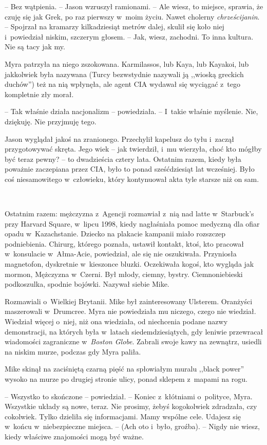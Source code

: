 \documentclass[oneside,polish,11pt,sfheadings]{mwbk}
\begin{document}
-- Bez wątpienia. -- Jason wzruszył ramionami. -- Ale wiesz, to miejsce,
sprawia, że czuję się jak Grek, po raz pierwszy w~moim życiu. Nawet
cholerny \textit{chrześcijanin}. -- Spojrzał na kramarzy kilkadziesiąt
metrów dalej, skulił się koło niej i~powiedział niskim, szczerym głosem.
-- Jak, wiesz, zachodni. To inna kultura. Nie są tacy jak my.

Myra patrzyła na niego zszokowana. Karmilassos, lub Kaya, lub Kayakoi,
lub jakkolwiek była nazywana (Turcy bezwstydnie nazywali ją ,,wioską
greckich duchów'') też na nią wpłynęła, ale agent CIA wydawał się
wyciągać z~tego kompletnie zły morał.

-- Tak właśnie działa nacjonalizm -- powiedziała. -- I~takie właśnie
myślenie. Nie, dziękuję. Nie przyjmuję tego.

Jason wyglądał jakoś na zranionego. Przechylił kapelusz do tyłu i~zaczął
przygotowywać skręta. Jego wiek -- jak twierdził, i~mu wierzyła, choć kto
mógłby być teraz pewny? -- to dwadzieścia cztery lata. Ostatnim razem,
kiedy była poważnie zaczepiana przez CIA, było to ponad sześćdziesiąt
lat wcześniej. Było coś niesamowitego w~człowieku, który kontynuował
akta tyle starsze niż on sam.

~

Ostatnim razem: mężczyzna z~Agencji rozmawiał z~nią nad latte w~Starbuck's przy Harvard Square, w~lipcu 1998, kiedy nagłaśniała pomoc
medyczną dla ofiar opadu w~Kazachstanie. Dziecko na plakacie kampanii
miało rozszczep podniebienia. Chirurg, którego poznała, ustawił kontakt,
ktoś, kto pracował w~konsulacie w~Ałma-Acie, powiedział, ale się nie
oszukiwała. Przyniosła magnetofon, dyskretnie w~kieszonce bluzki.
Oczekiwała kogoś, kto wygląda jak mormon, Mężczyzna w~Czerni. Był młody,
ciemny, bystry. Ciemnoniebieski podkoszulka, spodnie bojówki. Nazywał
siebie Mike.

Rozmawiali o~Wielkiej Brytanii. Mike był zainteresowany Ulsterem.
Oranżyści maszerowali w~Drumcree. Myra nie powiedziała mu niczego, czego
nie wiedział. Wiedział więcej o~niej, niż ona wiedziała, od niechcenia podane
nazwy demonstracji, na których była w~latach siedemdziesiątych, gdy
leniwie przewracał wiadomości zagraniczne w~\textit{Boston Globe}. Zabrali
swoje kawy na zewnątrz, usiedli na niskim murze, podczas gdy Myra
paliła.

Mike skinął na zaciśniętą czarną pięść na spłowiałym muralu ,,black
power'' wysoko na murze po drugiej stronie ulicy, ponad sklepem z~mapami
na rogu. 

-- Wszystko to skończone -- powiedział. -- Koniec z~kłótniami o~polityce, Myra. Wszystkie układy są nowe, teraz. Nie prosimy, żebyś
kogokolwiek zdradzała, czy cokolwiek. Tylko dzieliła się informacjami.
Mamy wspólne cele. Udajesz się w~końcu w~niebezpieczne miejsca. -- (Ach
oto i~było, groźba). -- Nigdy nie wiesz, kiedy właściwe znajomości mogą
być ważne.
\end{document}

